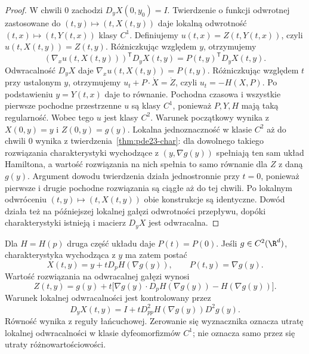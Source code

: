 \begin{proof}
W chwili $0$ zachodzi $D_yX(0,y_0)=I$.
Twierdzenie o funkcji odwrotnej zastosowane do
$(t,y)\mapsto(t,X(t,y))$ daje lokalną odwrotność
$(t,x)\mapsto(t,Y(t,x))$ klasy $C^1$.
Definiujemy $u(t,x)=Z(t,Y(t,x))$, czyli
$u(t,X(t,y))=Z(t,y)$.
Różniczkując względem $y$, otrzymujemy
\[
 (\nabla_xu(t,X(t,y)))^{\mathsf T}D_yX(t,y)
 =P(t,y)^{\mathsf T}D_yX(t,y).
\]
Odwracalność $D_yX$ daje $\nabla_xu(t,X(t,y))=P(t,y)$.
Różniczkując względem $t$ przy ustalonym $y$,
otrzymujemy $u_t+P\cdot\dot X=\dot Z$,
czyli $u_t=-H(X,P)$.
Po podstawieniu $y=Y(t,x)$ daje to równanie.
Pochodna czasowa i wszystkie pierwsze pochodne
przestrzenne $u$ są klasy $C^1$,
ponieważ $P,Y,H$ mają taką regularność.
Wobec tego $u$ jest klasy $C^2$.
Warunek początkowy wynika z $X(0,y)=y$ i $Z(0,y)=g(y)$.
Lokalna jednoznaczność w klasie $C^2$ aż do chwili
$0$ wynika z twierdzenia~\ref{thm:pde23-char}:
dla dowolnego takiego rozwiązania charakterystyki
wychodzące z $(y,\nabla g(y))$ spełniają ten sam
układ Hamiltona, a wartość rozwiązania na nich
spełnia to samo równanie dla $Z$ z daną $g(y)$.
Argument dowodu twierdzenia działa jednostronnie
przy $t=0$, ponieważ pierwsze i drugie pochodne
rozwiązania są ciągłe aż do tej chwili.
Po lokalnym odwróceniu $(t,y)\mapsto(t,X(t,y))$
obie konstrukcje są identyczne.
Dowód działa też na późniejszej lokalnej gałęzi
odwrotności przepływu, dopóki charakterystyki
istnieją i macierz $D_yX$ jest odwracalna.
\end{proof}

Dla $H=H(p)$ druga część układu daje $P(t)=P(0)$.
Jeśli $g\in C^2(\R^d)$, charakterystyka wychodząca
z $y$ ma zatem postać
\begin{equation}\label{eq:pde23-explicit-char}
 X(t,y)=y+tD_pH(\nabla g(y)),\qquad P(t,y)=\nabla g(y).
\end{equation}
Wartość rozwiązania na odwracalnej gałęzi wynosi
\[
 Z(t,y)=g(y)+t\bigl[
 \nabla g(y)\cdot D_pH(\nabla g(y))-H(\nabla g(y))\bigr].
\]
Warunek lokalnej odwracalności jest kontrolowany przez
\begin{equation}\label{eq:pde23-jacobian}
 D_yX(t,y)=I+tD_{pp}^2H(\nabla g(y))D^2g(y).
\end{equation}
Równość wynika z reguły łańcuchowej.
Zerowanie się wyznacznika oznacza utratę lokalnej
odwracalności w klasie dyfeomorfizmów $C^1$;
nie oznacza samo przez się utraty różnowartościowości.

